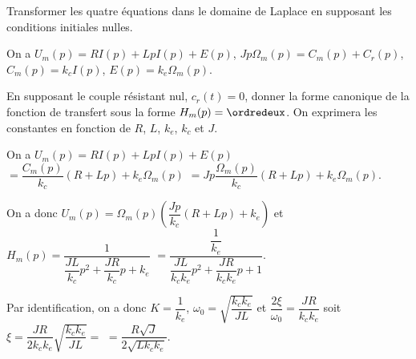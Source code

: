 \ifprof
\else
{}
\fi

\begin{question}
Transformer les quatre équations dans le domaine de Laplace en supposant les conditions
initiales nulles.
\end{question}
\ifprof
\begin{corrige}
On a $U_m(p) = RI(p) + L pI(p) + E(p)$, 
$J p\Omega_m(p) = C_m(p) + C_r(p)$, 
$C_m(p) = k_c I(p)$, 
$E(p) = k_e\Omega_m(p)$.
\end{corrige}
\else
\fi




\begin{question}
En supposant le couple résistant nul, $c_r(t) = 0$, donner la forme canonique de la fonction de
transfert  sous la forme $H_m(p) = \ordredeux$. On exprimera les constantes en fonction de $R$, $L$, $k_e$, $k_c$ et $J$.
\end{question}
\ifprof
\begin{corrige}
On a $U_m(p) = RI(p) + L pI(p) + E(p)$
$ =  \dfrac{C_m(p)}{k_c} \left(R+ Lp\right) + k_e\Omega_m(p) $
$ =  Jp\dfrac{\Omega_m(p)}{k_c} \left(R+ Lp\right) + k_e\Omega_m(p) $.

On a donc 
$U_m(p) =\Omega_m(p)\left(\dfrac{Jp}{k_c} \left(R+ Lp\right) + k_e\right) $ 
et $H_m(p)=\dfrac{1}{\dfrac{JL}{k_c}p^2 +\dfrac{JR}{k_c}p + k_e}$
$=\dfrac{\dfrac{1}{k_e}}{\dfrac{JL}{k_ck_e}p^2 +\dfrac{JR}{k_ck_e}p + 1}$.

Par identification, on a donc $K= \dfrac{1}{k_e}$, $\omega_0 =\sqrt{ \dfrac{k_ck_e}{JL}}$ et
$\dfrac{2\xi}{\omega_0}= \dfrac{JR}{k_ck_e}$ soit $\xi =  \dfrac{JR}{2 k_ck_e}\sqrt{ \dfrac{k_ck_e}{JL}} = $
$=  \dfrac{R\sqrt{J}}{2 \sqrt{L k_ck_e}} $.

\end{corrige}
\else
\fi


